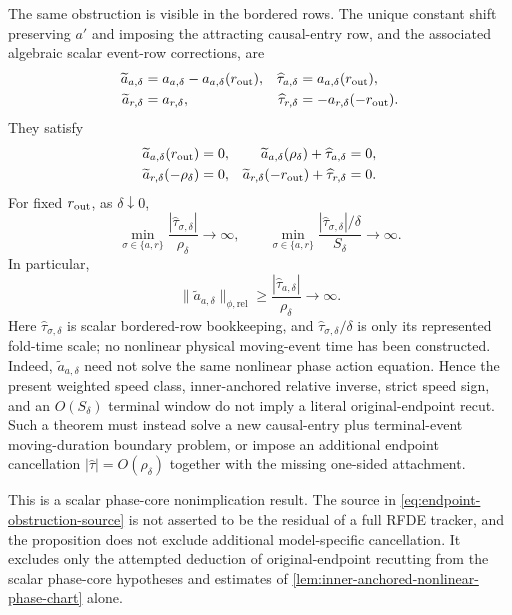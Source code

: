 \begin{proposition}
The same obstruction is visible in the bordered rows.  The unique constant
shift preserving \(a'\) and imposing the attracting causal-entry row, and
the associated algebraic scalar event-row corrections, are
\begin{align}
 \widetilde a_{a,\delta}
 &=a_{a,\delta}-a_{a,\delta}(r_{\rm out}),
 &\widehat\tau_{a,\delta}
 &=a_{a,\delta}(r_{\rm out}),\notag\\
 \widetilde a_{r,\delta}
 &=a_{r,\delta},
 &\widehat\tau_{r,\delta}
 &=-a_{r,\delta}(-r_{\rm out}).                  \label{eq:endpoint-obstruction-row-reanchoring}
\end{align}
They satisfy
\begin{align}
 \widetilde a_{a,\delta}(r_{\rm out})&=0,
 &\widetilde a_{a,\delta}(\rho_\delta)
       +\widehat\tau_{a,\delta}&=0,\notag\\
 \widetilde a_{r,\delta}(-\rho_\delta)&=0,
 &\widetilde a_{r,\delta}(-r_{\rm out})
       +\widehat\tau_{r,\delta}&=0.              \label{eq:endpoint-obstruction-rows}
\end{align}
For fixed \(r_{\rm out}\), as \(\delta\downarrow0\),
\begin{equation}
 \min_{\sigma\in\{a,r\}}
 \frac{|\widehat\tau_{\sigma,\delta}|}{\rho_\delta}
 \longrightarrow\infty,
 \qquad
 \min_{\sigma\in\{a,r\}}
 \frac{|\widehat\tau_{\sigma,\delta}|/\delta}{S_\delta}
 \longrightarrow\infty.                         \label{eq:endpoint-obstruction-scale-divergence}
\end{equation}
In particular,
\begin{equation}
 \|\widetilde a_{a,\delta}\|_{\phi,\mathrm{rel}}
 \ge
 \frac{|\widehat\tau_{a,\delta}|}{\rho_\delta}
 \longrightarrow\infty.                         \label{eq:endpoint-obstruction-relative-norm}
\end{equation}
Here \(\widehat\tau_{\sigma,\delta}\) is scalar bordered-row bookkeeping, and
\(\widehat\tau_{\sigma,\delta}/\delta\) is only its represented fold-time
scale; no nonlinear physical moving-event time has been constructed.
Indeed, \(\widetilde a_{a,\delta}\) need not solve the same nonlinear phase
action equation.  Hence the present weighted speed class, inner-anchored
relative inverse, strict speed sign, and an \(O(S_\delta)\) terminal window
do not imply a literal original-endpoint recut.  Such a theorem must instead
solve a new causal-entry plus terminal-event moving-duration boundary
problem, or impose an additional endpoint cancellation
\(|\widehat\tau|=O(\rho_\delta)\) together with the missing one-sided
attachment.

This is a scalar phase-core nonimplication result.  The source in
\cref{eq:endpoint-obstruction-source} is not asserted to be the residual of
a full RFDE tracker, and the proposition does not exclude additional
model-specific cancellation.  It excludes only the attempted deduction of
original-endpoint recutting from the scalar phase-core hypotheses and
estimates of
\cref{lem:inner-anchored-nonlinear-phase-chart} alone.
\end{proposition}


